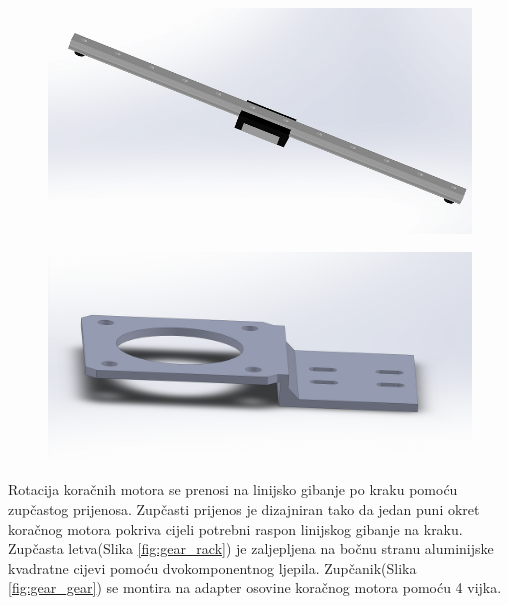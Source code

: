 \documentclass[11pt,a4paper]{article}
\begin{document}
\begin{figure}[H]
\centering
\begin{minipage}{.5\textwidth}
  \centering
  \includegraphics[width=.9\linewidth]{figures/linear_guide_7mm.png}
  \label{fig:klizni_mehanizam}
\end{minipage}%
\begin{minipage}{.5\textwidth}
  \centering
  \includegraphics[width=.9\linewidth]{figures/stepper_bracket.png}
  \label{fig:stepper_bracket}
\end{minipage}
\end{figure}

Rotacija koračnih motora se prenosi na linijsko gibanje po kraku pomoću zupčastog prijenosa. Zupčasti prijenos je dizajniran tako da jedan puni okret koračnog motora pokriva cijeli potrebni raspon linijskog gibanje na kraku. 
Zupčasta letva(Slika \ref{fig:gear_rack}) je zaljepljena na bočnu stranu aluminijske kvadratne cijevi pomoću dvokomponentnog ljepila. Zupčanik(Slika \ref{fig:gear_gear}) se montira na adapter osovine koračnog motora pomoću 4 vijka. 
\end{document}
